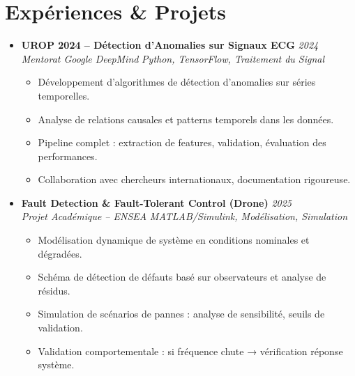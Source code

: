 \documentclass[a4paper,11pt]{article}
\begin{document}
\section{Expériences \& Projets}
\begin{itemize}[leftmargin=*, label={-}]

\item \textbf{UROP 2024 -- Détection d'Anomalies sur Signaux ECG} \hfill \textit{2024} \\
\textit{Mentorat Google DeepMind} \hfill \textit{Python, TensorFlow, Traitement du Signal}
\vspace{-2pt}
    \begin{itemize}[leftmargin=0.4cm, nosep, label=\tiny$\bullet$]
        \item \small{Développement d'algorithmes de détection d'anomalies sur séries temporelles.}
        \item \small{Analyse de relations causales et patterns temporels dans les données.}
        \item \small{Pipeline complet : extraction de features, validation, évaluation des performances.}
        \item \small{Collaboration avec chercheurs internationaux, documentation rigoureuse.}
    \end{itemize}
\vspace{3pt}

\item \textbf{Fault Detection \& Fault-Tolerant Control (Drone)} \hfill \textit{2025} \\
\textit{Projet Académique -- ENSEA} \hfill \textit{MATLAB/Simulink, Modélisation, Simulation}
\vspace{-2pt}
    \begin{itemize}[leftmargin=0.4cm, nosep, label=\tiny$\bullet$]
        \item \small{Modélisation dynamique de système en conditions nominales et dégradées.}
        \item \small{Schéma de détection de défauts basé sur observateurs et analyse de résidus.}
        \item \small{Simulation de scénarios de pannes : analyse de sensibilité, seuils de validation.}
        \item \small{Validation comportementale : si fréquence chute → vérification réponse système.}
    \end{itemize}
\vspace{3pt}


\end{itemize}
\end{document}

